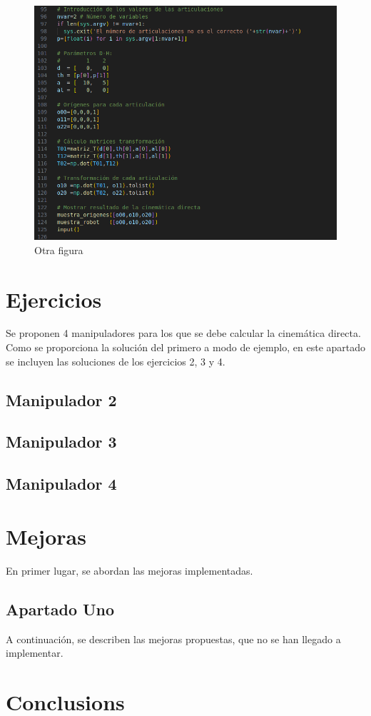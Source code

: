\begin{figure}[htb]
   \centering
   \includegraphics[width=1\linewidth]{images/cin_dir_1.png}
   \caption{Otra figura}
   \label{chapter:cap3}
\end{figure}
\section{Ejercicios}
Se proponen 4 manipuladores para los que se debe calcular la cinemática directa. Como se proporciona la solución del primero a modo de ejemplo, en este apartado se incluyen las soluciones de los ejercicios 2, 3 y 4.
\subsection{Manipulador 2}
\subsection{Manipulador 3}
\subsection{Manipulador 4}

\section{Mejoras}
En primer lugar, se abordan las mejoras implementadas.
\subsection{Apartado Uno}

A continuación, se describen las mejoras propuestas, que no se han llegado a implementar.


\section{Conclusions}